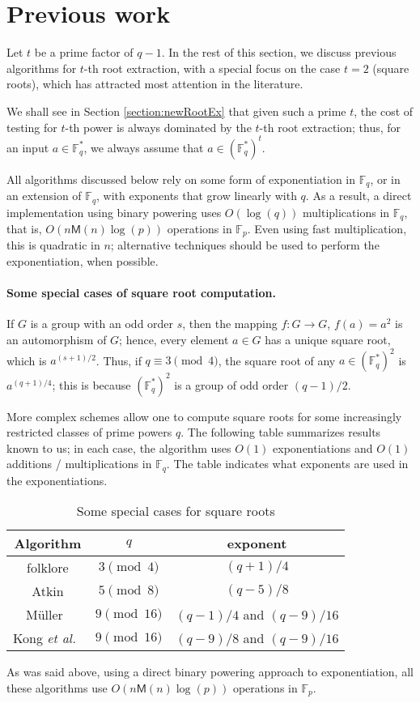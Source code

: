 \documentclass[12pt]{article}
\theoremstyle{plain}
\theoremstyle{definition}
\newcommand{\refsection}[1]{Section \ref{#1}}
\def\F{\mathbb{F}}
\def\M{\mathsf{M}}
\newcounter{algorithm}
\begin{document}
\section{Previous work}

Let $t$ be a prime factor of $q-1$.  In the rest of this section, we discuss
previous algorithms for $t$-th root extraction, with a special focus
on the case $t=2$ (square roots), which has attracted most attention
in the literature.

We shall see in \refsection{section:newRootEx} that given such a prime
$t$, the cost of testing for $t$-th power is always dominated by the
$t$-th root extraction; thus, for an input $a \in \F_q^*$, we always
assume that $a \in (\F_q^*)^t$.

All algorithms discussed below rely on some form of exponentiation in
$\F_q$, or in an extension of $\F_q$, with exponents that grow
linearly with $q$. As a result, a direct implementation using binary
powering uses $O(\log(q))$ multiplications in $\F_q$, that is,
$O(n\M(n)\log(p))$ operations in $\F_p$. Even using fast
multiplication, this is quadratic in $n$; alternative techniques
should be used to perform the exponentiation, when possible.

\paragraph{Some special cases of square root computation.}
If $G$ is a group with an odd order $s$, then the mapping $f: G
\rightarrow G$, $f(a) = a^2$ is an automorphism of $G$; hence, every
element $a \in G$ has a unique square root, which is $a^{(s +
  1)/2}$. Thus, if $q \equiv 3 \pmod 4$, the square root of any $a \in
(\F_q^*)^2$ is $a^{(q + 1) / 4}$; this is because $(\F_q^*)^2$ is a
group of odd order $(q - 1) / 2$.

More complex schemes allow one to compute square roots for some
increasingly restricted classes of prime powers $q$. The following
table summarizes results known to us; in each case, the algorithm uses
$O(1)$ exponentiations and $O(1)$ additions / multiplications in
$\F_q$. The table indicates what exponents are used in the
exponentiations.

  \begin{table}[h]
    \caption{Some special cases for square roots}\label{table1}
\begin{center}
\begin{tabular}{c|c|c}
Algorithm & $q$ & exponent \\\hline
folklore  & $3 \pmod 4$ & $(q + 1) / 4$ \\
Atkin     & $5 \pmod 8$ & $(q-5)/8$ \\
M\"uller~\cite{Muller04} & $9 \pmod {16}$ & $(q-1)/4$ and $(q-9)/16$\\
Kong {\it et al.}~\cite{KoCaYuLi06} & $9 \pmod {16}$ & $(q-9)/8$ and $(q-9)/16$
\end{tabular}
\end{center}
  \end{table}
\noindent As was said above, using a direct binary powering approach to
exponentiation, all these algorithms use $O(n\M(n)\log(p))$ operations
in $\F_p$.
\end{document}
